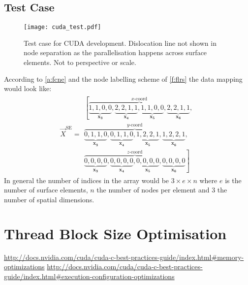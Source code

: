 \subsection{Test Case}
\begin{figure}
	\texttt{[image: cuda\_test.pdf]}
	\caption[Test case for CUDA development.]{Test case for CUDA development. Dislocation line not shown in node separation as the parallelisation happens across surface elements. Not to perspective or scale.}
	\label{f:cuda_test}
\end{figure}
According to \cref{a:fcne} and the node labelling scheme of \cref{f:flrs} the data mapping would look like:
\begin{align}\label{eq:cuda_test}
	\vec{X}^{\textrm{SE}} =
	\begin{split}
		\left[\overbrace{\underbrace{1,1,0,0}_{\mathbf{x_{3}}}, \underbrace{2,2,1,1}_{\mathbf{x_{4}}},
		\underbrace{1,1,0,0}_{\mathbf{x_{5}}}, \underbrace{2,2,1,1}_{\mathbf{x_{6}}}}^{x\textrm{-coord}},\right.\\
		\overbrace{\underbrace{0,1,1,0}_{\mathbf{x_{3}}}, \underbrace{0,1,1,0}_{\mathbf{x_{4}}},
		\underbrace{1,2,2,1}_{\mathbf{x_{5}}}, \underbrace{1,2,2,1}_{\mathbf{x_{6}}}}^{y\textrm{-coord}},\\
		\left.\overbrace{\underbrace{0,0,0,0}_{\mathbf{x_{3}}}, \underbrace{0,0,0,0}_{\mathbf{x_{4}}},
		\underbrace{0,0,0,0}_{\mathbf{x_{5}}}, \underbrace{0,0,0,0}_{\mathbf{x_{6}}}}^{z\textrm{-coord}}\right]
	\end{split}
\end{align}
In general the number of indices in the array would be $ 3 \times e \times n $ where $ e $ is the number of surface elements, $ n $ the number of nodes per element and 3 the number of spatial dimensions.
%
\section{Thread Block Size Optimisation}
\href{http://docs.nvidia.com/cuda/cuda-c-best-practices-guide/index.html#memory-optimizations}{http://docs.nvidia.com/cuda/cuda-c-best-practices-guide/index.html\#memory-optimizations}
\href{http://docs.nvidia.com/cuda/cuda-c-best-practices-guide/index.html#execution-configuration-optimizations}{http://docs.nvidia.com/cuda/cuda-c-best-practices-guide/index.html\#execution-configuration-optimizations}
\savearabiccounter
